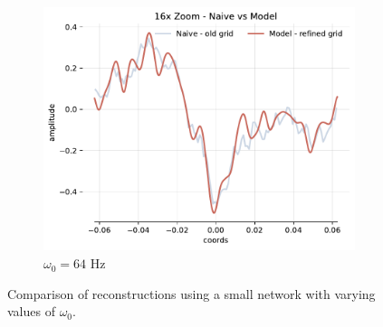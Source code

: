 \begin{figure}[h]
\begin{subfigure}[b]{0.32\textwidth}
        \centering
        \includegraphics[width=\textwidth]{img/ch4/16x_zoom-1hl-16hf-64hz.pdf}
        \caption{$\omega_0=64$ Hz}
    \end{subfigure}
    \caption{Comparison of reconstructions using a small network with varying values of $\omega_0$.}
    \label{f:capacity-filter-16hf-increasing-omega}
\end{figure}

 





